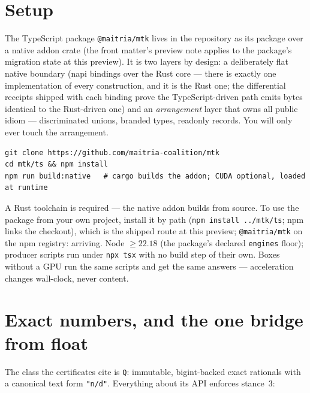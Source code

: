 \section{Setup}
\label{sec:tut-setup}

The TypeScript package \texttt{@maitria/mtk} lives in the
 repository as its  package
over a native addon crate (the front matter's preview note applies to
the package's migration state at this preview). It is two layers by
design: a deliberately flat native boundary (napi bindings over the
Rust core --- there is exactly one implementation of every
construction, and it is the Rust one; the differential receipts
shipped with each binding prove the TypeScript-driven path emits
bytes identical to the Rust-driven one) and an \emph{arrangement}
layer that owns all public idiom --- discriminated unions, branded
types, readonly records. You will only ever touch the arrangement.

\begin{Verbatim}[fontsize=\small,frame=leftline,rulecolor=\color{accentmid},framesep=3mm,xleftmargin=3mm]
git clone https://github.com/maitria-coalition/mtk
cd mtk/ts && npm install
npm run build:native   # cargo builds the addon; CUDA optional, loaded at runtime
\end{Verbatim}

\noindent A Rust toolchain is required --- the native addon builds
from source. To use the package from your own project, install it by
path (\texttt{npm install ../mtk/ts}; npm links the checkout), which
is the shipped route at this preview; \texttt{@maitria/mtk} on the
npm registry: arriving. Node $\ge 22.18$ (the package's declared
\texttt{engines} floor); producer scripts run under
\texttt{npx tsx} with no build step of their own. Boxes without a GPU
run the same scripts and get the same answers --- acceleration
changes wall-clock, never content.

\section{Exact numbers, and the one bridge from float}
\label{sec:tut-exact}

The class the certificates cite is \texttt{Q}: immutable,
bigint-backed exact rationals with a canonical text form
\texttt{"n/d"}. Everything about its API enforces stance~3:






